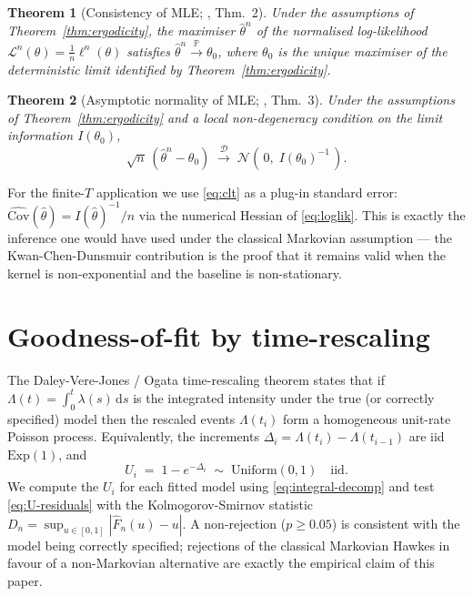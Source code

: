 \documentclass[article,shortnames,nojss]{jss}
\newcommand{\rmd}{\,\mathrm{d}}
\newcommand{\PP}{\mathbb{P}}
\newcommand{\1}{\mathbbm{1}}
\newcommand{\converginP}{\overset{\PP}{\rightarrow}}
\newcommand{\converginD}{\overset{\mathcal{D}}{\rightarrow}}
\theoremstyle{plain}
\newtheorem{theorem}{Theorem}
\theoremstyle{definition}
\begin{document}
\begin{theorem}[Consistency of MLE; \citep{kwan2025nonstationary}, Thm.~2]
\label{thm:consistency}
Under the assumptions of Theorem~\ref{thm:ergodicity},
the maximiser $\hat\theta^n$ of the normalised log-likelihood
$\mathcal{L}^n(\theta) = \frac1n\ell^n(\theta)$ satisfies
$\hat\theta^n \converginP \theta_0$, where $\theta_0$ is the
unique maximiser of the deterministic limit identified by
Theorem~\ref{thm:ergodicity}.
\end{theorem}

\begin{theorem}[Asymptotic normality of MLE; \citep{kwan2025nonstationary}, Thm.~3]
\label{thm:asym-normality}
Under the assumptions of Theorem~\ref{thm:ergodicity} and a local
non-degeneracy condition on the limit information $I(\theta_0)$,
\begin{equation}\label{eq:clt}
  \sqrt{n}\,(\hat\theta^n - \theta_0)
  \;\converginD\; \mathcal{N}\!\left(\,0,\; I(\theta_0)^{-1}\,\right).
\end{equation}
\end{theorem}

For the finite-$T$ application we use \eqref{eq:clt} as a
plug-in standard error: $\widehat{\mathrm{Cov}}(\hat\theta) =
I(\hat\theta)^{-1}/n$ via the numerical Hessian of \eqref{eq:loglik}.
This is exactly the inference one would have used under the
classical Markovian assumption --- the Kwan-Chen-Dunsmuir
contribution is the proof that it remains valid when the kernel is
non-exponential and the baseline is non-stationary.

\section{Goodness-of-fit by time-rescaling}\label{sec:gof}

The Daley-Vere-Jones / Ogata time-rescaling theorem
\citep{Daley2003,ogata1988statistical,BrownEtAl2002} states that if $\Lambda(t) =
\int_0^t \lambda(s) \rmd s$ is the integrated intensity under the
true (or correctly specified) model then the rescaled events
$\Lambda(t_i)$ form a homogeneous unit-rate Poisson process.
Equivalently, the increments $\Delta_i = \Lambda(t_i) -
\Lambda(t_{i-1})$ are iid $\mathrm{Exp}(1)$, and
\begin{equation}\label{eq:U-residuals}
  U_i \;=\; 1 - e^{-\Delta_i}
  \;\sim\; \mathrm{Uniform}(0,1)\quad\text{iid}.
\end{equation}
We compute the $U_i$ for each fitted model using
\eqref{eq:integral-decomp} and test \eqref{eq:U-residuals} with the
Kolmogorov-Smirnov statistic
$D_n = \sup_{u\in[0,1]} |\hat F_n(u) - u|$.  A non-rejection
($p \ge 0.05$) is consistent with the model being correctly
specified; rejections of the classical Markovian Hawkes in favour
of a non-Markovian alternative are exactly the empirical claim of
this paper.
\end{document}
